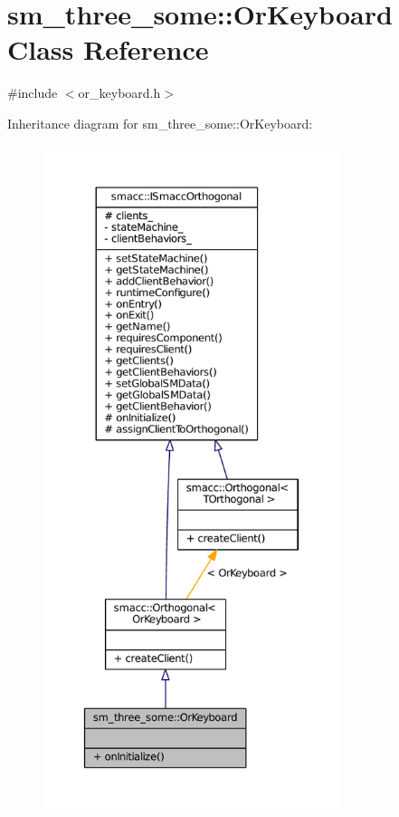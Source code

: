\hypertarget{classsm__three__some_1_1OrKeyboard}{}\section{sm\+\_\+three\+\_\+some\+:\+:Or\+Keyboard Class Reference}
\label{classsm__three__some_1_1OrKeyboard}


{\ttfamily \#include $<$or\+\_\+keyboard.\+h$>$}



Inheritance diagram for sm\+\_\+three\+\_\+some\+:\+:Or\+Keyboard\+:
\nopagebreak
\begin{figure}[H]
\begin{center}
\leavevmode
\includegraphics[height=550pt]{classsm__three__some_1_1OrKeyboard__inherit__graph}
\end{center}
\end{figure}


